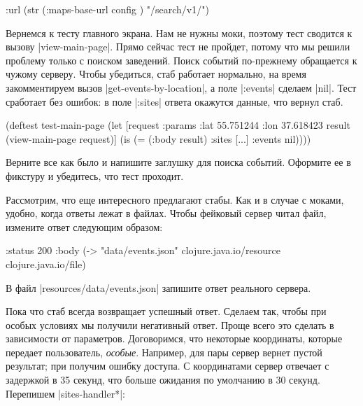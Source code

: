 \begin{english}
  \begin{clojure}
:url (str (:maps-base-url config ) "/search/v1/")
  \end{clojure}
\end{english}

Вернемся к тесту главного экрана. Нам не нужны моки, поэтому тест сводится к
вызову \spverb|view-main-page|. Прямо сейчас тест не пройдет, потому что мы
решили проблему только с поиском заведений. Поиск событий по-прежнему обращается
к чужому серверу. Чтобы убедиться, стаб работает нормально, на время
закомментируем вызов \spverb|get-events-by-location|, а поле \spverb|:events|
сделаем \spverb|nil|. Тест сработает без ошибок: в поле \spverb|:sites| ответа
окажутся данные, что вернул стаб.

\begin{english}
  \begin{clojure}
(deftest test-main-page
  (let [request {:params {:lat 55.751244
                          :lon 37.618423}}
        result (view-main-page request)]
    (is (= (:body result) {:sites [...] :events nil}))))
  \end{clojure}
\end{english}

Верните все как было и напишите заглушку для поиска событий. Оформите ее в
фикстуру и убедитесь, что тест проходит.

Рассмотрим, что еще интересного предлагают стабы. Как и в случае с моками,
удобно, когда ответы лежат в файлах. Чтобы фейковый сервер читал файл, измените
ответ следующим образом:

\begin{english}
  \begin{clojure}
{:status 200
 :body (-> "data/events.json"
           clojure.java.io/resource
           clojure.java.io/file)}
  \end{clojure}
\end{english}

В файл \spverb|resources/data/events.json| запишите ответ реального сервера.

Пока что стаб всегда возвращает успешный ответ. Сделаем так, чтобы при особых
условиях мы получили негативный ответ. Проще всего это сделать в зависимости от
параметров. Договоримся, что некоторые координаты, которые передает
пользователь, \emph{особые}. Например, для пары  сервер вернет пустой
результат; при  получим ошибку доступа. С координатами
 сервер отвечает с задержкой в 35 секунд, что больше ожидания по
умолчанию в 30 секунд. Перепишем \spverb|sites-handler*|:

